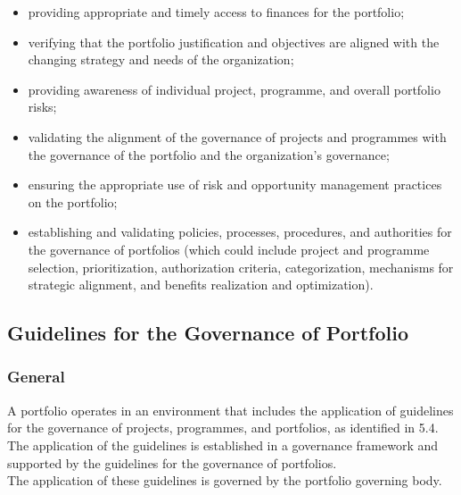 \documentclass[letterpaper,10pt,english]{jupyterBook}
\begin{document}
\begin{itemize}
\item {} 
\sphinxAtStartPar
providing appropriate and timely access to finances for the portfolio;

\item {} 
\sphinxAtStartPar
verifying that the portfolio justification and objectives are aligned with the changing strategy and needs of the organization;

\item {} 
\sphinxAtStartPar
providing awareness of individual project, programme, and overall portfolio risks;

\item {} 
\sphinxAtStartPar
validating the alignment of the governance of projects and programmes with the governance of the portfolio and the organization’s governance;

\item {} 
\sphinxAtStartPar
ensuring the appropriate use of risk and opportunity management practices on the portfolio;

\item {} 
\sphinxAtStartPar
establishing and validating policies, processes, procedures, and authorities for the governance of portfolios (which could include project and programme selection, prioritization, authorization criteria, categorization, mechanisms for strategic alignment, and benefits realization and optimization).

\end{itemize}


\subsection{Guidelines for the Governance of Portfolio}
\label{\detokenize{PM/ppm:guidelines-for-the-governance-of-portfolio}}

\subsubsection{General}
\label{\detokenize{PM/ppm:id4}}
\sphinxAtStartPar
A portfolio operates in an environment that includes the application of guidelines for the governance of projects, programmes, and portfolios, as identified in 5.4. \\
The application of the guidelines is established in a governance framework and supported by the guidelines for the governance of portfolios. \\
The application of these guidelines is governed by the portfolio governing body.
\end{document}
